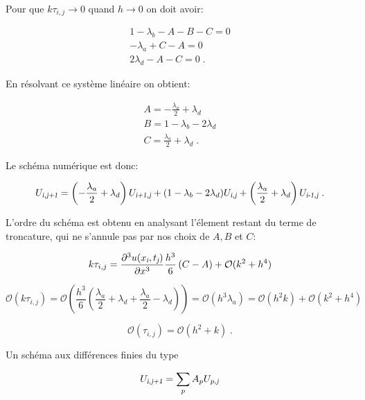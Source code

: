 \documentclass[a4paper, 12pt]{report}
\begin{document}
Pour que $k \tau_{i,j} \to 0$ quand $h \to 0$ on doit avoir:

\begin{align}
  1-\lambda_b - A -B -C = 0\\
  -\lambda_a +C - A =0\\
  2 \lambda_d -A -C = 0\;.
\end{align}

En résolvant ce système linéaire on obtient:

\begin{align}
  A = -\frac{\lambda_a}{2} + \lambda_d\\
  B = 1-\lambda_b - 2\lambda_d\\
  C = \frac{\lambda_a}{2} + \lambda_d\;.
\end{align}

Le schéma numérique est donc:

\begin{equation}
U_{\textsl{i},\textsl{j+1}} = \left ( -\frac{\lambda_a}{2} + \lambda_d \right ) U_{\textsl{i+1},\textsl{j}} + (1-\lambda_b - 2\lambda_d) U_{\textsl{i},\textsl{j}} + \left (\frac{\lambda_a}{2} + \lambda_d \right ) U_{\textsl{i-1},\textsl{j}} \;.
\label{eq:schema_lax_wendroff}
\end{equation}

L'ordre du schéma est obtenu en analysant l'élement restant du terme de troncature,
qui ne s'annule pas par nos choix de $A,B$ et $C$:

\begin{equation}
    k\tau_{i,j} = \frac{\partial^3 u(x_{\textsl{i}},t_{\textsl{j}})}{\partial x^3} \frac{h^3}{6} \left (C-A \right ) + \mathcal{O}(k^2+h^4)
\end{equation}

\begin{equation}
    \mathcal{O}(k\tau_{i,j}) = \mathcal{O} \left (\frac{h^3}{6} \left ( \frac{\lambda_a}{2} + \lambda_d+\frac{\lambda_a}{2} - \lambda_d \right ) \right ) = \mathcal{O} \left (h^3 \lambda_a \right ) = \mathcal{O} \left (h^2 k \right ) + \mathcal{O}(k^2+h^4)
\end{equation}

\begin{equation}
    \mathcal{O}(\tau_{i,j}) = \mathcal{O} \left (h^2 + k\right )\;.
\end{equation}

Un schéma aux différences finies du type

\begin{equation}
U_{\textsl{i},\textsl{j+1}} = \sum_p A_p U_{\textsl{p},\textsl{j}}
\end{equation}
\end{document}
